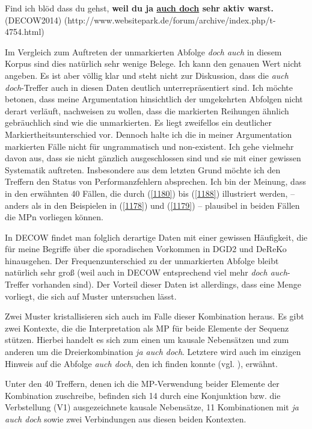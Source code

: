 {\begin{exe}
	\ex\label{1188} 
	\scriptsize
	Find ich blöd dass du gehst, \textbf{weil du ja \underline{auch doch} sehr aktiv warst.}	
	\hfill\hbox{(DECOW2014)}	
	\newline
	\hbox{}\hfill\hbox{(http://www.websitepark.de/forum/archive/index.php/t-4754.html)}
\end{exe}						
Im Vergleich zum Auftreten der unmarkierten Abfolge \textit{doch auch} in diesem Kor\-pus sind dies natürlich sehr wenige Belege. Ich kann den genauen Wert nicht angeben. Es ist aber völlig klar und steht nicht zur Diskussion, dass die \textit{auch doch}-Treffer auch in diesen Daten deutlich unterrepräsentiert sind. Ich möchte betonen, dass meine Argumentation hinsichtlich der umgekehrten Abfolgen nicht derart verläuft, nachweisen zu wollen, dass die markierten Reihungen ähnlich gebräuchlich sind wie die unmarkierten. Es liegt zweifellos ein deutlicher Markiert\-heitsunterschied  vor. Dennoch halte ich die in meiner Argumentation markierten Fälle nicht für ungrammatisch und non-existent. Ich gehe vielmehr davon aus, dass sie nicht gänzlich ausgeschlossen sind und sie mit einer gewissen Systema\-tik auftreten. Insbesondere aus dem letzten Grund möchte ich den Treffern den Status von Performanzfehlern absprechen. Ich bin der Meinung, dass in den erwähnten 40 Fällen, die durch (\ref{1180}) bis (\ref{1188}) illustriert werden, – anders als in den Beispielen in (\ref{1178}) und (\ref{1179}) – plausibel in beiden Fällen die MPn vorliegen können.

In DECOW findet man folglich derartige Daten mit einer gewissen Häufigkeit, die für meine Begriffe über die sporadischen Vorkommen in DGD2 und DeReKo hinausgehen. Der Frequenzunterschied zu der unmarkierten Abfolge bleibt natürlich sehr groß (weil auch in DECOW entsprechend viel mehr \textit{doch auch}-Treffer vorhanden sind). Der Vorteil dieser Daten ist allerdings, dass eine Menge vorliegt, die sich auf Muster untersuchen lässt.

Zwei Muster kristallisieren sich auch im Falle dieser Kombination heraus. Es gibt zwei Kontexte, die die Interpretation als MP für beide Elemente der Sequenz stützen. Hierbei handelt es sich zum einen um kausale Nebensätzen und zum anderen um die Dreierkombination \textit{ja auch doch}. Letztere wird auch im einzigen Hinweis auf die Abfolge \textit{auch doch}, den ich finden konnte (vgl. \citealt[254]{Hentschel1986}), erwähnt. 

Unter den 40 Treffern, denen ich die MP-Verwendung beider Elemente der Kombination zuschreibe, befinden sich 14 durch eine Konjunktion bzw. die Verb\-stellung (V1) ausgezeichnete kausale Nebensätze, 11 Kombinationen mit \textit{ja auch doch} sowie zwei Verbindungen aus diesen beiden Kontexten.

}
